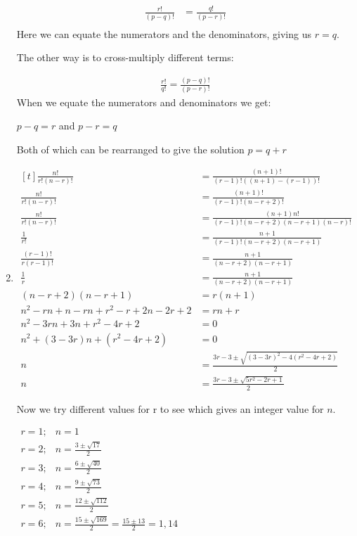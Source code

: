 \documentclass[../main.tex]{subfiles}
\begin{document}
\begin{enumerate}
    \begin{align*}
        \frac{r!}{(p-q)!}
        &=\frac{q!}{(p-r)!}\\
    \end{align*}
    Here we can equate the numerators and the denominators, giving us \(r=q\).

    The other way is to cross-multiply different terms:

    \begin{align*}
    \frac{r!}{q!}=\frac{(p-q)!}{(p-r)!}
    \end{align*}
    When we equate the numerators and denominators we get:

    \(p-q=r\) and \(p-r=q\)

    Both of which can be rearranged to give the solution \(p=q+r\)
    \item 
    $
    \!
    \begin{aligned}[t]
    \frac{n!}{r!(n-r)!}
    &=\frac{(n+1)!}{(r-1)!((n+1)-(r-1))!}\\
    \frac{n!}{r!(n-r)!}
    &=\frac{(n+1)!}{(r-1)!(n-r+2)!}\\
    \frac{n!}{r!(n-r)!}
    &=\frac{(n+1)n!}{(r-1)!(n-r+2)(n-r+1)(n-r)!}\\
    \frac{1}{r!}
    &=\frac{n+1}{(r-1)!(n-r+2)(n-r+1)}\\
    \frac{(r-1)!}{r(r-1)!}
    &=\frac{n+1}{(n-r+2)(n-r+1)}\\
    \frac{1}{r}
    &=\frac{n+1}{(n-r+2)(n-r+1)}\\
    (n-r+2)(n-r+1)
    &=r(n+1)\\
    n^2 - rn + n -rn+r^2-r+2n-2r+2
    &=rn+r\\
    n^2-3rn+3n+r^2-4r+2
    &=0\\
    n^2+(3-3r)n+(r^2-4r+2)
    &=0\\
    n
    &=\frac{3r-3 \pm \sqrt{(3-3r)^2-4(r^2-4r+2)}}{2}\\
    n
    &=\frac{3r-3 \pm \sqrt{5r^2-2r+1}}{2}
    \end{aligned}
    $

    Now we try different values for r to see which gives an integer value for \(n\).
    
    $
    \begin{aligned}
    r=1; &n=1\\
    r=2; &n=\frac{3 \pm \sqrt{17}}{2}\\
    r=3; &n=\frac{6 \pm \sqrt{40}}{2}\\
    r=4; &n=\frac{9 \pm \sqrt{73}}{2}\\
    r=5; &n=\frac{12 \pm \sqrt{112}}{2}\\
    r=6; &n=\frac{15 \pm \sqrt{169}}{2}=\frac{15\pm 13}{2}=1,14
    \end{aligned}
    $
\end{enumerate}
\end{document}
